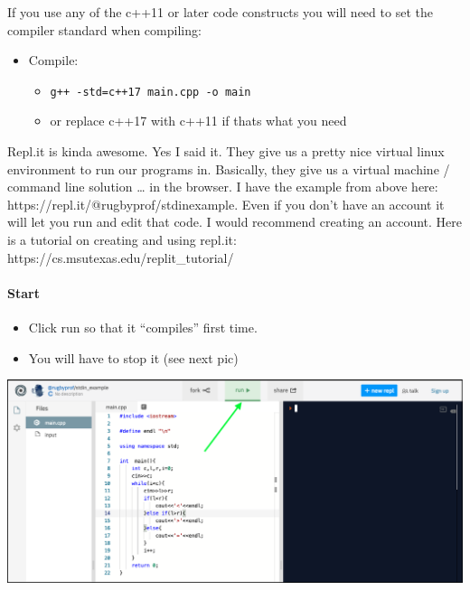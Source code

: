 If you use any of the c++11 or later code constructs you will need to
set the compiler standard when compiling:

\begin{itemize}
\tightlist
\item
  Compile:

  \begin{itemize}
  \tightlist
  \item
    \texttt{g++\ -std=c++17\ main.cpp\ -o\ main}
  \item
    or replace c++17 with c++11 if thats what you need
  \end{itemize}
\end{itemize}

\hypertarget{repl.it}{%
\label{repl.it}}

Repl.it is kinda awesome. Yes I said it. They give us a pretty nice
virtual linux environment to run our programs in. Basically, they give
us a virtual machine / command line solution \ldots{} in the browser. I
have the example from above here:
https://repl.it/{@rugbyprof/stdinexample}. Even if you don't have an
account it will let you run and edit that code. I would recommend
creating an account. Here is a tutorial on creating and using repl.it:
https://cs.msutexas.edu/replit\_tutorial/

\hypertarget{start-1}{%
\paragraph{Start}\label{start-1}}

\begin{itemize}
\tightlist
\item
  Click run so that it ``compiles'' first time.
\item
  You will have to stop it (see next pic)
\end{itemize}


\begin{center}
\includegraphics[scale=.4]{images/replit_stdin_1.png}
\end{center}

